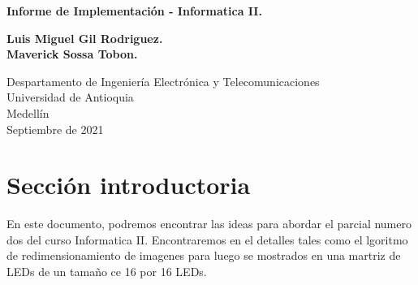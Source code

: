 \documentclass{article}
\begin{document}
\begin{titlepage}
    \begin{center}
        \vspace*{1cm}
            
        \Huge
        \textbf{Informe de Implementación - Informatica II.}
            
        \vspace{0.5cm}
        \LARGE
            
        \vspace{1.5cm}
            
        \textbf{Luis Miguel Gil Rodriguez.}
        \\
        \textbf{Maverick Sossa Tobon.}
        \vfill
        \vspace{0.8cm}
            
        \Large
        Despartamento de Ingeniería Electrónica y Telecomunicaciones\\
        Universidad de Antioquia\\
        Medellín\\
        Septiembre de 2021
            
    \end{center}
\end{titlepage}
\tableofcontents
\newpage
\section{Sección introductoria} \label{intro}
En este documento, podremos encontrar las ideas para abordar el parcial numero dos del curso Informatica II. Encontraremos en el detalles tales como el lgoritmo de redimensionamiento de imagenes para luego se mostrados en una martriz de LEDs de un tamaño ce 16 por 16 LEDs.
\end{document}
